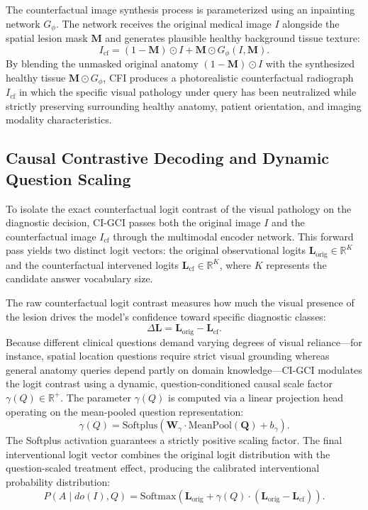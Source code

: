 \documentclass[journal,twoside,web]{ieeecolor}
\begin{document}
The counterfactual image synthesis process is parameterized using an inpainting network $G_{\phi}$. The network receives the original medical image $I$ alongside the spatial lesion mask $\mathbf{M}$ and generates plausible healthy background tissue texture:
\begin{equation}
I_{\text{cf}} = (1 - \mathbf{M}) \odot I + \mathbf{M} \odot G_{\phi}(I, \mathbf{M}).
\label{eq:inpainting}
\end{equation}
By blending the unmasked original anatomy $(1 - \mathbf{M}) \odot I$ with the synthesized healthy tissue $\mathbf{M} \odot G_{\phi}$, CFI produces a photorealistic counterfactual radiograph $I_{\text{cf}}$ in which the specific visual pathology under query has been neutralized while strictly preserving surrounding healthy anatomy, patient orientation, and imaging modality characteristics.

\subsection{Causal Contrastive Decoding and Dynamic Question Scaling}
To isolate the exact counterfactual logit contrast of the visual pathology on the diagnostic decision, CI-GCI passes both the original image $I$ and the counterfactual image $I_{\text{cf}}$ through the multimodal encoder network. This forward pass yields two distinct logit vectors: the original observational logits $\mathbf{L}_{\text{orig}} \in \mathbb{R}^{K}$ and the counterfactual intervened logits $\mathbf{L}_{\text{cf}} \in \mathbb{R}^{K}$, where $K$ represents the candidate answer vocabulary size.

The raw counterfactual logit contrast measures how much the visual presence of the lesion drives the model's confidence toward specific diagnostic classes:
\begin{equation}
\Delta \mathbf{L} = \mathbf{L}_{\text{orig}} - \mathbf{L}_{\text{cf}}.
\label{eq:ite}
\end{equation}
Because different clinical questions demand varying degrees of visual reliance---for instance, spatial location questions require strict visual grounding whereas general anatomy queries depend partly on domain knowledge---CI-GCI modulates the logit contrast using a dynamic, question-conditioned causal scale factor $\gamma(Q) \in \mathbb{R}^{+}$. The parameter $\gamma(Q)$ is computed via a linear projection head operating on the mean-pooled question representation:
\begin{equation}
\gamma(Q) = \text{Softplus}\left(\mathbf{W}_{\gamma} \cdot \text{MeanPool}(\mathbf{Q}) + b_{\gamma}\right).
\label{eq:gamma_q}
\end{equation}
The Softplus activation guarantees a strictly positive scaling factor. The final interventional logit vector combines the original logit distribution with the question-scaled treatment effect, producing the calibrated interventional probability distribution:
\begin{equation}
P(A \mid do(I), Q) = \text{Softmax}\left(\mathbf{L}_{\text{orig}} + \gamma(Q) \cdot (\mathbf{L}_{\text{orig}} - \mathbf{L}_{\text{cf}})\right).
\label{eq:calibrated_prob}
\end{equation}
\end{document}
